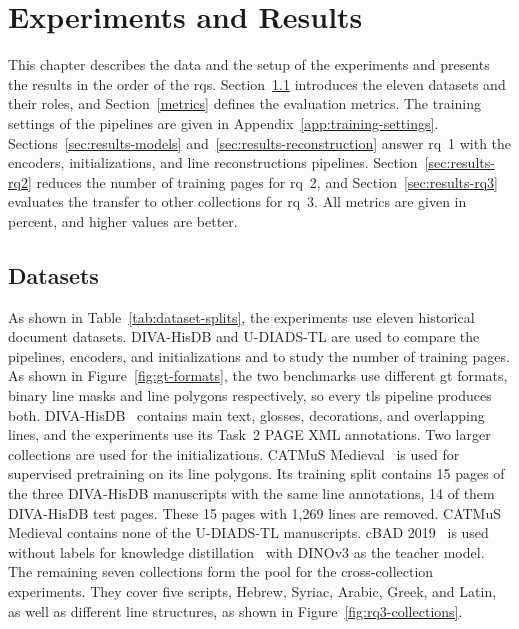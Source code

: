 \chapter{Experiments and Results}
\label{ch:data}\label{ch:results}

This chapter describes the data and the setup of the experiments and presents the results in the order of the \glspl{rq}. Section~\ref{sec:datasets} introduces the eleven datasets and their roles, and Section~\ref{metrics} defines the evaluation metrics. The training settings of the pipelines are given in Appendix~\ref{app:training-settings}. Sections~\ref{sec:results-models} and~\ref{sec:results-reconstruction} answer \gls{rq}~1 with the encoders, initializations, and line reconstructions pipelines. Section~\ref{sec:results-rq2} reduces the number of training pages for \gls{rq}~2, and Section~\ref{sec:results-rq3} evaluates the transfer to other collections for \gls{rq}~3. All metrics are given in percent, and higher values are better.


\section{Datasets}
\label{sec:datasets}\label{sec:data-benchmarks}\label{sec:data-pretraining}\label{sec:data-cross}

As shown in Table~\ref{tab:dataset-splits}, the experiments use eleven historical document datasets. DIVA-HisDB and U-DIADS-TL are used to compare the pipelines, encoders, and initializations and to study the number of training pages. As shown in Figure~\ref{fig:gt-formats}, the two benchmarks use different \gls{gt} formats, binary line masks and line polygons  respectively, so every  \gls{tls} pipeline produces both. DIVA-HisDB~\cite{diva_hisdb} contains main text, glosses, decorations, and overlapping lines, and the experiments use its Task~2 PAGE XML annotations. Two larger collections are used for the initializations. CATMuS Medieval~\cite{catmus-medieval} is used for supervised pretraining on its line polygons. Its training split contains 15 pages of the three DIVA-HisDB manuscripts with the same line annotations, 14 of them DIVA-HisDB test pages. These 15 pages with 1,269 lines are removed. CATMuS Medieval contains none of the U-DIADS-TL manuscripts. cBAD 2019~\cite{cbad-2019} is used without labels for knowledge distillation~\cite{beyer2022knowledgedistillationgoodteacher} with DINOv3 as the teacher model. The remaining seven collections form the pool for the cross-collection experiments. They cover five scripts, Hebrew, Syriac, Arabic, Greek, and Latin, as well as different line structures, as shown in Figure~\ref{fig:rq3-collections}.


